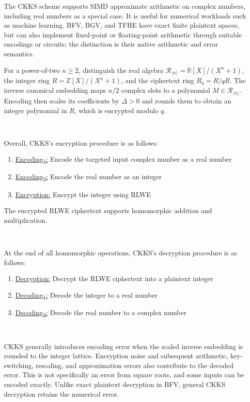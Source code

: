 The CKKS scheme supports SIMD approximate arithmetic on complex numbers, including real numbers as a special case. It is useful for numerical workloads such as machine learning. BFV, BGV, and TFHE have exact finite plaintext spaces, but can also implement fixed-point or floating-point arithmetic through suitable encodings or circuits; the distinction is their native arithmetic and error semantics.~\cite{ckks-original}

For a power-of-two $n\geq 2$, distinguish the real algebra $\mathcal{R}_{\langle n\rangle}=\mathbb{R}[X]/(X^n+1)$, the integer ring $R=\mathbb{Z}[X]/(X^n+1)$, and the ciphertext ring $R_q=R/qR$. The inverse canonical embedding maps $n/2$ complex slots to a polynomial $M\in\mathcal{R}_{\langle n\rangle}$. Encoding then scales its coefficients by $\Delta>0$ and rounds them to obtain an integer polynomial in $R$, which is encrypted modulo $q$.


$ $

\noindent Overall, CKKS's encryption procedure is as follows:

\begin{enumerate}
\item \underline{\textsf{Encoding\textsubscript{1}}:} Encode the targeted input complex number as a real number
\item \underline{\textsf{Encoding\textsubscript{2}}:} Encode the real number as an integer
\item \underline{\textsf{Encryption}:} Encrypt the integer using RLWE
\end{enumerate}
The encrypted RLWE ciphertext supports homomorphic addition and multiplication.

$ $

\noindent At the end of all homomorphic operations, CKKS's decryption procedure is as follows:

\begin{enumerate}
\item \underline{\textsf{Decryption}:} Decrypt the RLWE ciphertext into a plaintext integer
\item \underline{\textsf{Decoding\textsubscript{1}}:} Decode the integer to a real number
\item \underline{\textsf{Decoding\textsubscript{2}}:} Decode the real number to a complex number
\end{enumerate}

$ $

CKKS generally introduces encoding error when the scaled inverse embedding is rounded to the integer lattice. Encryption noise and subsequent arithmetic, key-switching, rescaling, and approximation errors also contribute to the decoded error. This is not specifically an error from square roots, and some inputs can be encoded exactly. Unlike exact plaintext decryption in BFV, general CKKS decryption retains the numerical error.

